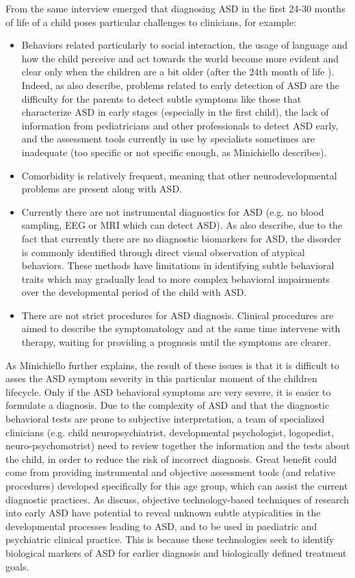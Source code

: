 From the same interview emerged that diagnosing ASD in the first 24-30 months of life of a child poses particular challenges to clinicians, for example:
\begin{itemize}
    \item Behaviors related particularly to social interaction, the usage of language and how the child perceive and act towards the world become more evident and clear only when the children are a bit older (after the 24th month of life \citep{orlandi2014advancedtools,bocchi2012earlydiagnosis}). Indeed, as also \cite{vargas2016diagnosis} describe, problems related to early detection of ASD are the difficulty for the parents to detect subtle symptoms like those that characterize ASD in early stages (especially in the first child), the lack of information from pediatricians and other professionals to detect ASD early, and the assessment tools currently in use by specialists sometimes are inadequate (too specific or not specific enough, as Minichiello describes).
    \item Comorbidity is relatively frequent, meaning that other neurodevelopmental problems are present along with ASD.
    \item Currently there are not instrumental diagnostics for ASD (e.g. no blood sampling, EEG or MRI which can detect ASD). As also \cite{samad2017markers} describe, due to the fact that currently there are no diagnostic biomarkers for ASD, the disorder is commonly identified through direct visual observation of atypical behaviors. These methods have limitations in identifying subtle behavioral traits which may gradually lead to more complex behavioral impairments over the developmental period of the child with ASD.
    \item There are not strict procedures for ASD diagnosis. Clinical procedures are aimed to describe the symptomatology and at the same time intervene with therapy, waiting for providing a prognosis until the symptoms are clearer.
\end{itemize}

As Minichiello further explains, the result of these issues is that it is difficult to asses the ASD symptom severity in this particular moment of the children lifecycle. Only if the ASD behavioral symptoms are very severe, it is easier to formulate a diagnosis. Due to the complexity of ASD and that the diagnostic behavioral tests are prone to subjective interpretation, a team of specialized clinicians (e.g. child neuropsychiatrist, developmental psychologist, logopedist, neuro-psychomotrist) need to review together the information and the tests about the child, in order to reduce the risk of incorrect diagnosis.
Great benefit could come from providing instrumental and objective assessment tools (and relative procedures) developed specifically for this age group, which can assist the current diagnostic practices. As \cite{bolte2016detection} discuss, objective technology-based techniques of research into early ASD have potential to reveal unknown subtle atypicalities in the developmental processes leading to ASD, and to be used in paediatric and psychiatric clinical practice. This is because these technologies seek to identify biological markers of ASD for earlier diagnosis and biologically defined treatment goals.


